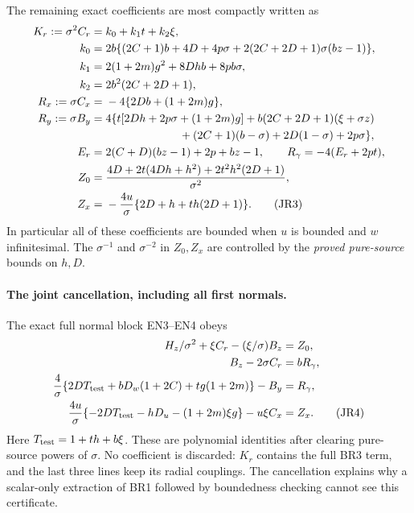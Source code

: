 The remaining exact coefficients are most compactly written as
\begin{align*}
 K_r:=\sigma^2C_r={}&k_0+k_1t+k_2\xi,\\
 k_0={}&2b\{(2C+1)b+4D+4p\sigma
             +2(2C+2D+1)\sigma(bz-1)\},\\
 k_1={}&2(1+2m)g^2+8Dhb+8pb\sigma,\\
 k_2={}&2b^2(2C+2D+1),\\
 R_x:=\sigma C_x={}&-4\{2Db+(1+2m)g\},\\
 R_y:=\sigma B_y={}&4\{t[2Dh+2p\sigma+(1+2m)g]
      +b(2C+2D+1)(\xi+\sigma z)\\
 &\hspace{23mm} +(2C+1)(b-\sigma)+2D(1-\sigma)+2p\sigma\},\\
 E_r={}&2(C+D)(bz-1)+2p+bz-1,\qquad
 R_\gamma=-4(E_r+2pt),\\
 Z_0={}&\frac{4D+2t(4Dh+h^2)+2t^2h^2(2D+1)}{\sigma^2},\\
 Z_x={}&-\frac{4u}{\sigma}\{2D+h+th(2D+1)\}.
\tag{JR3}
\end{align*}
In particular all of these coefficients are bounded when $u$ is bounded
and $w$ infinitesimal. The $\sigma^{-1}$ and $\sigma^{-2}$ in $Z_0,Z_x$
are controlled by the \emph{proved pure-source} bounds on $h,D$.

\paragraph{The joint cancellation, including all first normals.}
The exact full normal block EN3--EN4 obeys
\begin{align*}
 H_z/\sigma^2+\xi C_r-(\xi/\sigma)B_z&=Z_0,\\
 B_z-2\sigma C_r&=bR_\gamma,\\
 \frac4\sigma\{2DT_{\rm test}+bD_w(1+2C)+tg(1+2m)\}-B_y&=R_\gamma,\\
 \frac{4u}{\sigma}\{-2DT_{\rm test}-hD_u-(1+2m)\xi g\}
                         -u\xi C_x&=Z_x.
\tag{JR4}
\end{align*}
Here $T_{\rm test}=1+th+b\xi$. These are polynomial identities after clearing
pure-source powers of $\sigma$. No coefficient is discarded: $K_r$
contains the full BR3 term, and the last three lines keep its radial
couplings. The cancellation explains why a scalar-only extraction of
BR1 followed by boundedness checking cannot see this certificate.

